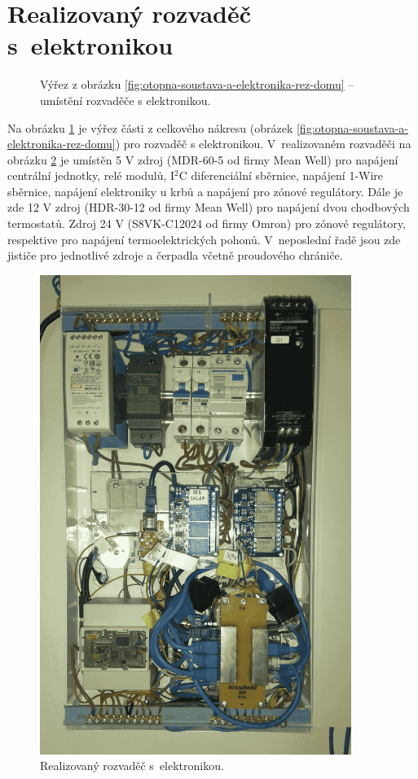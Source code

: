 \section{Realizovaný rozvaděč s~elektronikou}
\begin{figure}[H]
   \centering
   \def\svgwidth{0.5\columnwidth}
   
    \caption[Výřez pro umístění rozvaděče s elektronikou.]{Výřez z obrázku \ref{fig:otopna-soustava-a-elektronika-rez-domu} – umístění rozvaděče s elektronikou.}
    \label{fig:vyrez-rozvadec}
\end{figure}

Na obrázku \ref{fig:vyrez-rozvadec} je výřez části z celkového nákresu (obrázek \ref{fig:otopna-soustava-a-elektronika-rez-domu}) pro rozvaděč s elektronikou. V~realizovaném rozvaděči na obrázku \ref{fig:rozvadec-ve-sklepe-s-elektronikou} je umístěn 5 V zdroj (MDR-60-5 \cite{mdr-60-5} od firmy Mean Well) pro napájení centrální jednotky, relé modulů, I$^2$C diferenciální sběrnice, napájení 1-Wire sběrnice, napájení elektroniky u krbů a napájení pro zónové regulátory. Dále je zde 12 V zdroj (HDR-30-12 \cite{hdr-30-12} od firmy Mean Well) pro napájení dvou chodbových termostatů. Zdroj 24 V (S8VK-C12024 \cite{s8vk-c12024} od firmy Omron) pro zónové regulátory, respektive pro napájení termoelektrických pohonů. V~neposlední řadě jsou zde jističe pro jednotlivé zdroje a čerpadla včetně proudového chrániče.

\begin{figure}[H]
    \centering
    \includegraphics[width=0.9\textwidth]{images/rozvadec-ve-sklepe-s-elektronikou.png}
    \caption{Realizovaný rozvaděč s~elektronikou.}
    \label{fig:rozvadec-ve-sklepe-s-elektronikou}
\end{figure}